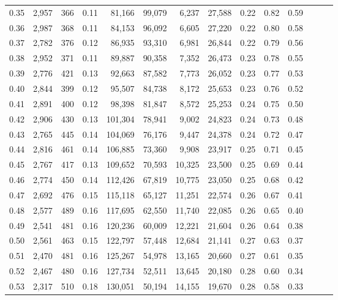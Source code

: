 \begin{tabular}{rrrrrrrrrrrrrr}
0.35 &  2,957 &    366 &  0.11 &   81,166 &   99,079 &   6,237 &  27,588 &  0.22 &  0.82 &      0.59 \\
0.36 &  2,987 &    368 &  0.11 &   84,153 &   96,092 &   6,605 &  27,220 &  0.22 &  0.80 &      0.58 \\
0.37 &  2,782 &    376 &  0.12 &   86,935 &   93,310 &   6,981 &  26,844 &  0.22 &  0.79 &      0.56 \\
0.38 &  2,952 &    371 &  0.11 &   89,887 &   90,358 &   7,352 &  26,473 &  0.23 &  0.78 &      0.55 \\
0.39 &  2,776 &    421 &  0.13 &   92,663 &   87,582 &   7,773 &  26,052 &  0.23 &  0.77 &      0.53 \\
0.40 &  2,844 &    399 &  0.12 &   95,507 &   84,738 &   8,172 &  25,653 &  0.23 &  0.76 &      0.52 \\
0.41 &  2,891 &    400 &  0.12 &   98,398 &   81,847 &   8,572 &  25,253 &  0.24 &  0.75 &      0.50 \\
0.42 &  2,906 &    430 &  0.13 &  101,304 &   78,941 &   9,002 &  24,823 &  0.24 &  0.73 &      0.48 \\
0.43 &  2,765 &    445 &  0.14 &  104,069 &   76,176 &   9,447 &  24,378 &  0.24 &  0.72 &      0.47 \\
0.44 &  2,816 &    461 &  0.14 &  106,885 &   73,360 &   9,908 &  23,917 &  0.25 &  0.71 &      0.45 \\
0.45 &  2,767 &    417 &  0.13 &  109,652 &   70,593 &  10,325 &  23,500 &  0.25 &  0.69 &      0.44 \\
0.46 &  2,774 &    450 &  0.14 &  112,426 &   67,819 &  10,775 &  23,050 &  0.25 &  0.68 &      0.42 \\
0.47 &  2,692 &    476 &  0.15 &  115,118 &   65,127 &  11,251 &  22,574 &  0.26 &  0.67 &      0.41 \\
0.48 &  2,577 &    489 &  0.16 &  117,695 &   62,550 &  11,740 &  22,085 &  0.26 &  0.65 &      0.40 \\
0.49 &  2,541 &    481 &  0.16 &  120,236 &   60,009 &  12,221 &  21,604 &  0.26 &  0.64 &      0.38 \\
0.50 &  2,561 &    463 &  0.15 &  122,797 &   57,448 &  12,684 &  21,141 &  0.27 &  0.63 &      0.37 \\
0.51 &  2,470 &    481 &  0.16 &  125,267 &   54,978 &  13,165 &  20,660 &  0.27 &  0.61 &      0.35 \\
0.52 &  2,467 &    480 &  0.16 &  127,734 &   52,511 &  13,645 &  20,180 &  0.28 &  0.60 &      0.34 \\
0.53 &  2,317 &    510 &  0.18 &  130,051 &   50,194 &  14,155 &  19,670 &  0.28 &  0.58 &      0.33 \\

\end{tabular}
